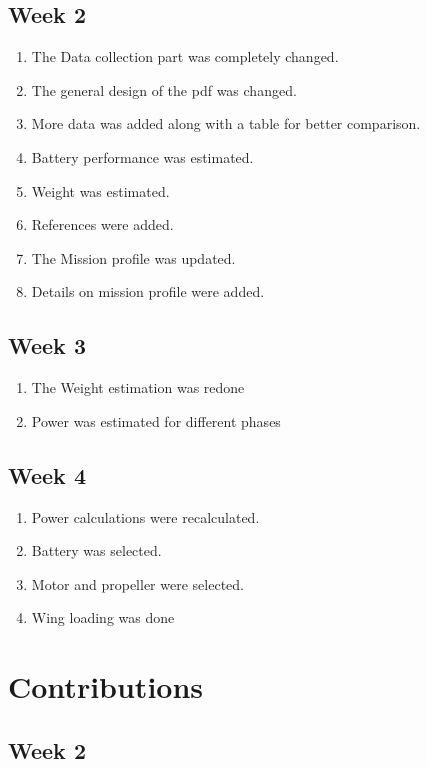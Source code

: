 \documentclass[12 pt]{article}
\begin{document}
\subsection{Week 2}
\begin{enumerate}
    \item The Data collection part was completely changed.
    \item The general design of the pdf was changed.
    \item More data was added along with a table for better comparison.
    \item Battery performance was estimated.
    \item Weight was estimated.
    \item References were added.
    \item The Mission profile was updated.
    \item Details on mission profile were added.
\end{enumerate}

\subsection{Week 3}
\begin{enumerate}
    \item The Weight estimation was redone
    \item Power was estimated for different phases 
\end{enumerate}

\subsection{Week 4}
\begin{enumerate}
    \item Power calculations were recalculated.
    \item Battery was selected.
    \item Motor and propeller were selected.
    \item Wing loading was done
\end{enumerate}

\newpage


\section{Contributions}

\subsection{Week 2}
\end{document}
